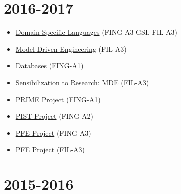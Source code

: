 \hypertarget{section-4}{%
\section{2016-2017}\label{section-4}}

\begin{itemize}
\tightlist
\item
  \href{https://campusneo.mines-nantes.fr/campus/course/view.php?id=1609}{Domain-Specific
  Languages} (FING-A3-GSI, FIL-A3)
\item
  \href{https://campusneo.mines-nantes.fr/campus/course/view.php?id=1628}{Model-Driven
  Engineering} (FIL-A3)
\item
  \href{https://campusneo.mines-nantes.fr/campus/course/view.php?id=1598}{Databases}
  (FING-A1)
\item
  \href{https://campusneo.mines-nantes.fr/campus/course/view.php?id=1532}{Sensibilization
  to Research: MDE} (FIL-A3)
\item
  \href{https://campusneo.mines-nantes.fr/campus/course/view.php?id=621}{PRIME
  Project} (FING-A1)
\item
  \href{https://campusneo.mines-nantes.fr/campus/course/view.php?id=115}{PIST
  Project} (FING-A2)
\item
  \href{https://campusneo.mines-nantes.fr/campus/course/view.php?id=1540}{PFE
  Project} (FING-A3)
\item
  \href{https://campusneo.mines-nantes.fr/campus/course/view.php?id=1344}{PFE
  Project} (FIL-A3)
\end{itemize}

\hypertarget{section-5}{%
\section{2015-2016}\label{section-5}}


